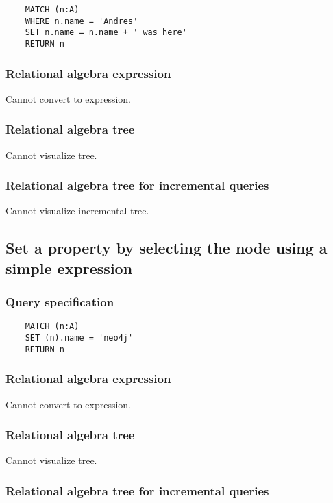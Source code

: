 	\begin{lstlisting}
	MATCH (n:A)
	WHERE n.name = 'Andres'
	SET n.name = n.name + ' was here'
	RETURN n
	\end{lstlisting}


	\subsubsection*{Relational algebra expression}

	Cannot convert to expression.

	\subsubsection*{Relational algebra tree}

	Cannot visualize tree.

	\subsubsection*{Relational algebra tree for incremental queries}

	Cannot visualize incremental tree.
	\subsection{Set a property by selecting the node using a simple expression}

	\subsubsection*{Query specification}

	\begin{lstlisting}
	MATCH (n:A)
	SET (n).name = 'neo4j'
	RETURN n
	\end{lstlisting}


	\subsubsection*{Relational algebra expression}

	Cannot convert to expression.

	\subsubsection*{Relational algebra tree}

	Cannot visualize tree.

	\subsubsection*{Relational algebra tree for incremental queries}

